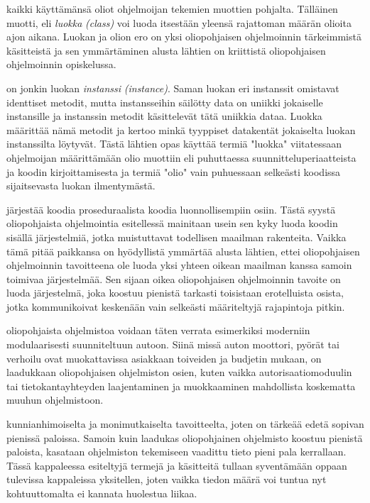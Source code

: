 \documentclass{tufte-book}
\newcommand{\eng}[1]{\textit{(#1)}}
\newcommand{\new}[1]{\textit{\gls{#1}}}
\newcommand{\neweng}[2]{\new{#1} \eng{#2}}
\begin{document}
 kaikki käyttämänsä oliot ohjelmoijan tekemien muottien pohjalta.
Tälläinen muotti, eli \neweng{luokka}{class} voi luoda itsestään yleensä rajattoman määrän olioita
ajon aikana. Luokan ja olion ero on yksi oliopohjaisen ohjelmoinnin tärkeimmistä käsitteistä ja
sen ymmärtäminen alusta lähtien on kriittistä oliopohjaisen ohjelmoinnin opiskelussa.

 on jonkin luokan \neweng{instanssi}{instance}. Saman luokan eri
instanssit omistavat identtiset metodit, mutta instansseihin säilötty data on uniikki jokaiselle
instansille ja instanssin metodit käsittelevät tätä uniikkia dataa. Luokka määrittää nämä metodit
ja kertoo minkä tyyppiset datakentät jokaiselta luokan instanssilta löytyvät. Tästä lähtien
opas käyttää termiä "luokka" viitatessaan ohjelmoijan määrittämään olio muottiin eli puhuttaessa
suunnitteluperiaatteista ja koodin kirjoittamisesta ja termiä "olio" vain puhuessaan selkeästi
koodissa sijaitsevasta luokan ilmentymästä.

 järjestää koodia proseduraalista koodia luonnollisempiin osiin.
Tästä syystä oliopohjaista ohjelmointia esitellessä mainitaan usein sen kyky luoda koodin sisällä
järjestelmiä, jotka muistuttavat todellisen maailman rakenteita. Vaikka tämä pitää paikkansa on
hyödyllistä ymmärtää alusta lähtien, ettei oliopohjaisen ohjelmoinnin tavoitteena ole luoda yksi
yhteen oikean maailman kanssa samoin toimivaa järjestelmää. Sen sijaan oikea oliopohjaisen
ohjelmoinnin tavoite on luoda järjestelmä, joka koostuu pienistä tarkasti toisistaan erotelluista
osista, jotka kommunikoivat keskenään vain selkeästi määriteltyjä rajapintoja pitkin.

 oliopohjaista ohjelmistoa voidaan täten verrata esimerkiksi
moderniin modulaarisesti suunniteltuun autoon. Siinä missä auton moottori, pyörät tai verhoilu
ovat muokattavissa asiakkaan toiveiden ja budjetin mukaan, on laadukkaan oliopohjaisen ohjelmiston
osien, kuten vaikka autorisaatiomoduulin tai tietokantayhteyden laajentaminen ja muokkaaminen
mahdollista koskematta muuhun ohjelmistoon.

 kunnianhimoiselta ja monimutkaiselta tavoitteelta, joten on tärkeää
edetä sopivan pienissä paloissa. Samoin kuin laadukas oliopohjainen ohjelmisto koostuu pienistä
paloista, kasataan ohjelmiston tekemiseen vaadittu tieto pieni pala kerrallaan. Tässä kappaleessa
esiteltyjä termejä ja käsitteitä tullaan syventämään oppaan tulevissa kappaleissa yksitellen,
joten vaikka tiedon määrä voi tuntua nyt kohtuuttomalta ei kannata huolestua liikaa.
\end{document}
